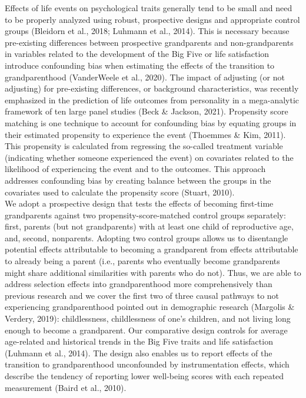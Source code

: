 \documentclass[
  english,
  man,floatsintext]{apa7}
\begin{document}
Effects of life events on psychological traits generally tend to be small and need to be properly analyzed using robust, prospective designs and appropriate control groups (Bleidorn et al., 2018; Luhmann et al., 2014). This is necessary because pre-existing differences between prospective grandparents and non-grandparents in variables related to the development of the Big Five or life satisfaction introduce confounding bias when estimating the effects of the transition to grandparenthood (VanderWeele et al., 2020). The impact of adjusting (or not adjusting) for pre-existing differences, or background characteristics, was recently emphasized in the prediction of life outcomes from personality in a mega-analytic framework of ten large panel studies (Beck \& Jackson, 2021). Propensity score matching is one technique to account for confounding bias by equating groups in their estimated propensity to experience the event (Thoemmes \& Kim, 2011). This propensity is calculated from regressing the so-called treatment variable (indicating whether someone experienced the event) on covariates related to the likelihood of experiencing the event and to the outcomes. This approach addresses confounding bias by creating balance between the groups in the covariates used to calculate the propensity score (Stuart, 2010).\\
We adopt a prospective design that tests the effects of becoming first-time grandparents against two propensity-score-matched control groups separately: first, parents (but not grandparents) with at least one child of reproductive age, and, second, nonparents. Adopting two control groups allows us to disentangle potential effects attributable to becoming a grandparent from effects attributable to already being a parent (i.e., parents who eventually become grandparents might share additional similarities with parents who do not). Thus, we are able to address selection effects into grandparenthood more comprehensively than previous research and we cover the first two of three causal pathways to not experiencing grandparenthood pointed out in demographic research (Margolis \& Verdery, 2019): childlessness, childlessness of one's children, and not living long enough to become a grandparent. Our comparative design controls for average age-related and historical trends in the Big Five traits and life satisfaction (Luhmann et al., 2014). The design also enables us to report effects of the transition to grandparenthood unconfounded by instrumentation effects, which describe the tendency of reporting lower well-being scores with each repeated measurement (Baird et al., 2010).\\
\end{document}
